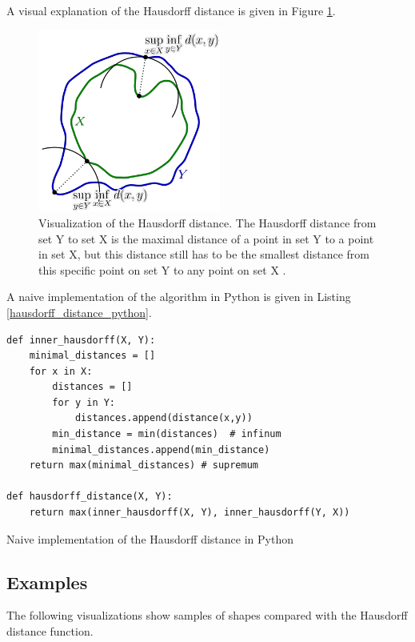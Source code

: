 A visual explanation of the Hausdorff distance is given in Figure \ref{hausdorff_distance}.

\begin{figure}[H]
\centering
\includegraphics[width=6cm]{chapters/06_hdm/images/hausdorff_distance.png}
\caption{Visualization of the Hausdorff distance. The Hausdorff distance from set Y to set X is the maximal distance of a point in set Y to a point in set X, but this distance still has to be the smallest distance from this specific point on set Y to any point on set X \cite{hausdorffdistanceimage}.}
\label{hausdorff_distance}
\end{figure}

A naive implementation of the algorithm in Python is given in Listing \ref{hausdorff_distance_python}.

\begin{listing}[H]
\begin{verbatim}
def inner_hausdorff(X, Y):
    minimal_distances = []
    for x in X:
        distances = []
        for y in Y:
            distances.append(distance(x,y))
        min_distance = min(distances)  # infinum
        minimal_distances.append(min_distance)
    return max(minimal_distances) # supremum

def hausdorff_distance(X, Y):
    return max(inner_hausdorff(X, Y), inner_hausdorff(Y, X))
\end{verbatim}
\caption{Naive implementation of the Hausdorff distance in Python}
\label{hausdorff_distance_python}
\end{listing}

\subsection{Examples}
The following visualizations show samples of shapes compared with the Hausdorff distance function.

